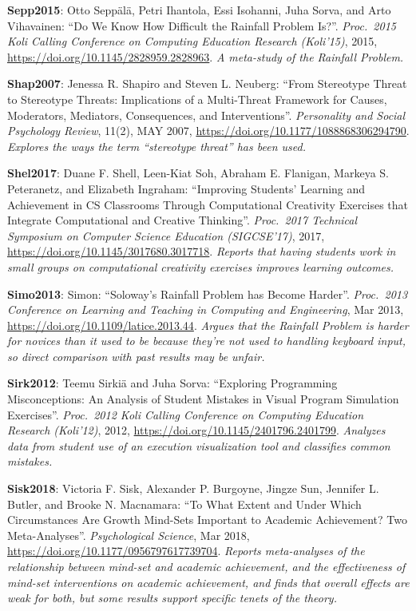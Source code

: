 \textbf{\hypertarget{b:Sepp2015}{Sepp2015}\label{b:Sepp2015}}: Otto Seppälä, Petri Ihantola, Essi Isohanni, Juha Sorva, and Arto Vihavainen: ``Do We Know How Difficult the Rainfall Problem Is?''. \emph{Proc.\ 2015 Koli Calling Conference on Computing Education Research (Koli'15)}, 2015, \url{https://doi.org/10.1145/2828959.2828963}. \emph{A meta-study of the Rainfall Problem.}

\textbf{\hypertarget{b:Shap2007}{Shap2007}\label{b:Shap2007}}: Jenessa R. Shapiro and Steven L. Neuberg: ``From Stereotype Threat to Stereotype Threats: Implications of a Multi-Threat Framework for Causes, Moderators, Mediators, Consequences, and Interventions''. \emph{Personality and Social Psychology Review}, 11(2), MAY 2007, \url{https://doi.org/10.1177/1088868306294790}. \emph{Explores the ways the term ``stereotype threat'' has been used.}

\textbf{\hypertarget{b:Shel2017}{Shel2017}\label{b:Shel2017}}: Duane F. Shell, Leen-Kiat Soh, Abraham E. Flanigan, Markeya S. Peteranetz, and Elizabeth Ingraham: ``Improving Students' Learning and Achievement in CS Classrooms Through Computational Creativity Exercises that Integrate Computational and Creative Thinking''. \emph{Proc.\ 2017 Technical Symposium on Computer Science Education (SIGCSE'17)}, 2017, \url{https://doi.org/10.1145/3017680.3017718}. \emph{Reports that having students work in small groups on computational creativity exercises improves learning outcomes.}

\textbf{\hypertarget{b:Simo2013}{Simo2013}\label{b:Simo2013}}: Simon: ``Soloway's Rainfall Problem has Become Harder''. \emph{Proc.\ 2013 Conference on Learning and Teaching in Computing and Engineering}, Mar 2013, \url{https://doi.org/10.1109/latice.2013.44}. \emph{Argues that the Rainfall Problem is harder for novices than it used to be because they're not used to handling keyboard input, so direct comparison with past results may be unfair.}

\textbf{\hypertarget{b:Sirk2012}{Sirk2012}\label{b:Sirk2012}}: Teemu Sirkiä and Juha Sorva: ``Exploring Programming Misconceptions: An Analysis of Student Mistakes in Visual Program Simulation Exercises''. \emph{Proc.\ 2012 Koli Calling Conference on Computing Education Research (Koli'12)}, 2012, \url{https://doi.org/10.1145/2401796.2401799}. \emph{Analyzes data from student use of an execution visualization tool and classifies common mistakes.}

\textbf{\hypertarget{b:Sisk2018}{Sisk2018}\label{b:Sisk2018}}: Victoria F. Sisk, Alexander P. Burgoyne, Jingze Sun, Jennifer L. Butler, and Brooke N. Macnamara: ``To What Extent and Under Which Circumstances Are Growth Mind-Sets Important to Academic Achievement? Two Meta-Analyses''. \emph{Psychological Science}, Mar 2018, \url{https://doi.org/10.1177/0956797617739704}. \emph{Reports meta-analyses of the relationship between mind-set and academic achievement, and the effectiveness of mind-set interventions on academic achievement, and finds that overall effects are weak for both, but some results support specific tenets of the theory.}

